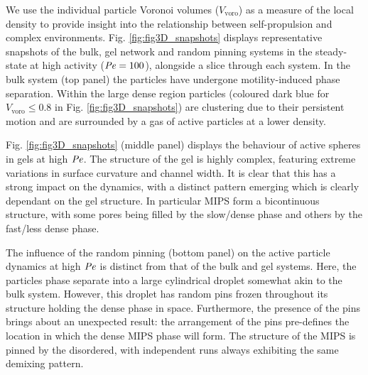 We use the individual particle Voronoi volumes ($V_{\textrm{voro}}$) as a measure of the local density to provide insight into the relationship between self-propulsion and complex environments. Fig. \ref{fig:fig3D_snapshots} displays representative snapshots of the bulk, gel network and random pinning systems in the steady-state at high activity ($\operatorname{\mathit{P\kern-.08em e}} = 100$), alongside a slice through each system. In the bulk system (top panel) the particles have undergone motility-induced phase separation. Within the large dense region  particles (coloured dark blue for $V_{\textrm{voro}} \leq 0.8$ in Fig. \ref{fig:fig3D_snapshots}) are clustering due to their persistent motion and are surrounded by a gas of active particles at a lower density.

Fig. \ref{fig:fig3D_snapshots} (middle panel) displays the behaviour of active spheres in gels at high $\operatorname{\mathit{P\kern-.08em e}}$. The structure of the gel is highly complex, featuring extreme variations in surface curvature and channel width. It is clear that this has a strong impact on the dynamics, with a distinct pattern emerging which is clearly dependant on the gel structure. In particular MIPS form a bicontinuous structure, with some pores being filled by the slow/dense phase and others by the fast/less dense phase. 



The influence of the random pinning (bottom panel) on the active particle dynamics at high $\operatorname{\mathit{P\kern-.08em e}}$ is distinct from that of the bulk and gel systems. Here, the particles phase separate into a large cylindrical droplet somewhat akin to the bulk system. However, this droplet has random pins frozen throughout its structure holding the dense phase in space. Furthermore, the presence of the pins brings about an unexpected result: the arrangement of the pins pre-defines the location in which the dense MIPS phase will form. The structure of the MIPS is pinned by the disordered, with independent runs always exhibiting the same demixing pattern. 


